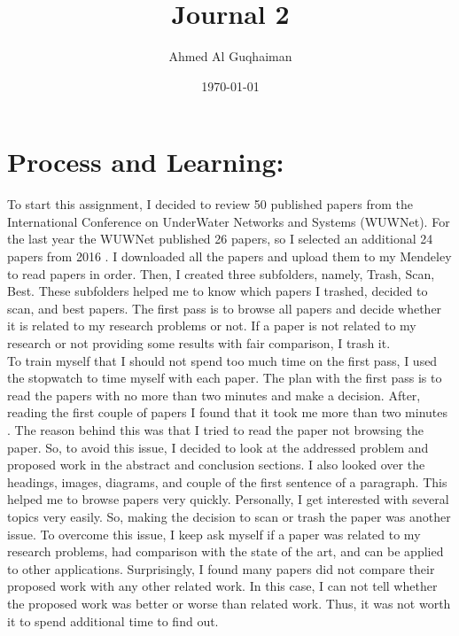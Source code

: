 \documentclass{article}
\begin{document}
\title{\textbf{Journal 2}}
\author{Ahmed Al Guqhaiman}
\date{\today}
\maketitle
\section*{Process and Learning:}
To start this assignment, I decided to review 50 published papers from the International Conference on UnderWater Networks and Systems (WUWNet). For the last year the WUWNet published 26 papers, so I selected an additional 24 papers from 2016 \cite{WUWNet17, WUWNet16}. I downloaded all the papers and upload them to my Mendeley to read papers in order. Then, I created three subfolders, namely, Trash, Scan, Best. These subfolders helped me to know which papers I trashed, decided to scan, and best papers. The first pass is to browse all papers and decide whether it is related to my research problems or not. If a paper is not related to my research or not providing some results with fair comparison, I trash it.\\ 

To train myself that I should not spend too much time on the first pass, I used the stopwatch to time myself with each paper. The plan with the first pass is to read the papers with no more than two minutes and make a decision. After, reading the first couple of papers I found that it took me more than two minutes \cite{MohammadrezaAlimadadi2017,ChristianSchlegelDmitryTruachevZahraAlavizadeh2017,Olokodana2017}. The reason behind this was that I tried to read the paper not browsing the paper. So, to avoid this issue, I decided to look at the addressed problem and proposed work in the abstract and conclusion sections. I also looked over the headings, images, diagrams, and couple of the first sentence of a paragraph. This helped me to browse papers very quickly. Personally, I get interested with several topics very easily. So, making the decision to scan or trash the paper was another issue. To overcome this issue, I keep ask myself if a paper was related to my research problems, had comparison with the state of the art, and can be applied to other applications. Surprisingly, I found many papers did not compare their proposed work with any other related work. In this case, I can not tell whether the proposed work was better or worse than related work. Thus, it was not worth it to spend additional time to find out.\\
\end{document}
